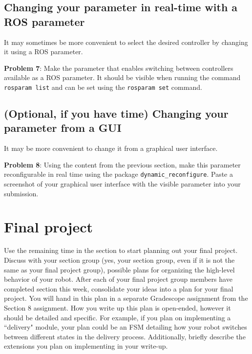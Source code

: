 \documentclass{article}
\begin{document}
\subsection{Changing your parameter in real-time with a ROS parameter}
It may sometimes be more convenient to select the desired controller by changing it using a ROS parameter.

\textbf{Problem 7}: Make the parameter that enables switching between controllers available as a ROS parameter. It should be visible when running the command \texttt{rosparam list} and can be set using the \texttt{rosparam set} command.

\subsection{(Optional, if you have time) Changing your parameter from a GUI}
It may be more convenient to change it from a graphical user interface. 

\textbf{Problem 8}: Using the content from the previous section, make this parameter reconfigurable in real time using the package 
\texttt{dynamic\_reconfigure}. Paste a screenshot of your graphical user interface with the visible parameter into your submission.

\section{Final project}
Use the remaining time in the section to start planning out your final project. Discuss with your section group (yes, your section group, even if it is not the same as your final project group), possible plans for organizing the high-level behavior of your robot. 
After each of your final project group members have completed section this week, consolidate your ideas into a plan for your final project. You will hand in this plan in a separate Gradescope assignment from the Section 8 assignment. 
How you write up this plan is open-ended, however it should be detailed and specific. For example, if you plan on implementing a ``delivery" module, your plan could be an FSM detailing how your robot switches between different states in the delivery process.
Additionally, briefly describe the extensions you plan on implementing in your write-up.
\end{document}
